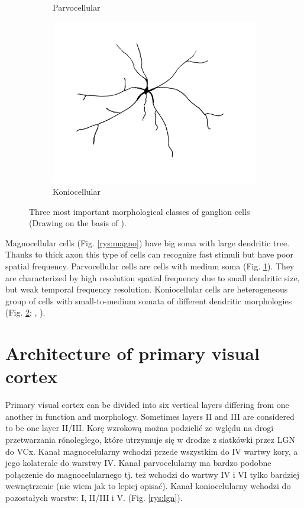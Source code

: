 \documentclass{pracalicmgr}
\begin{document}
\begin{figure}[H]
\begin{subfigure}{.33\textwidth}
		\caption{Parvocellular}
		\label{rys:parvo}
	\end{subfigure}
	\begin{subfigure}{.33\textwidth}
	\centering
	\includegraphics[width=1\linewidth]{cell_K2.png}
	\caption{Koniocellular}
	\label{rys:konio}
	\end{subfigure}
	\caption{Three most important morphological classes of ganglion cells  (Drawing on the basis of \cite{parallel}).}
	\label{rys:ganglio}
	\end{figure}
	 Magnocellular cells (Fig. \ref{rys:magno}) have big soma with large dendritic tree. Thanks to thick axon this type of cells can recognize fast stimuli but have poor spatial frequency. Parvocellular cells are cells with medium soma (Fig. \ref{rys:parvo}). They are characterized by high resolution spatial frequency due to small dendritic size, but weak temporal frequency resolution. Koniocellular cells are heterogeneous group of cells with small-to-medium somata of different dendritic morphologies (Fig. \ref{rys:konio}; \cite{parallel}, \cite{viola}). 
	
	
    \section{Architecture of primary visual cortex}
     Primary visual cortex can be divided into six vertical layers differing from one another in function and morphology. Sometimes layers II and III are considered to be one layer II/III.
     Korę wzrokową można podzielić ze wględu na drogi przetwarzania rónoległego, które utrzymuje się w  drodze z siatkówki przez LGN do VCx. Kanał magnocelularny wchodzi przede wszystkim do IV wartwy kory, a jego kolaterale do warstwy IV. Kanał parvocelularny ma bardzo podobne połączenie do magnocelularnego tj. też wchodzi do wartwy IV i VI tylko bardziej wewnętrzenie (nie wiem jak to lepiej opisać). Kanał koniocelularny wchodzi do pozostałych warstw: I, II/III i V.  (Fig. \ref{rys:lgn}).
	
\end{document}
